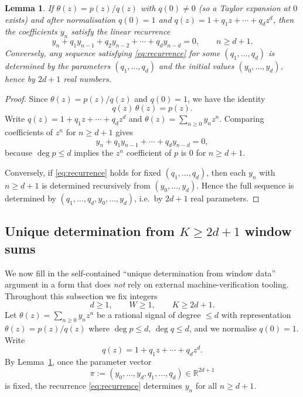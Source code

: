 \documentclass[11pt,reqno]{amsart}
\newtheorem{lemma}[theorem]{Lemma}
\theoremstyle{definition}
\theoremstyle{remark}
\newcommand{\R}{\mathbb{R}}
\newcommand{\1}{\mathbf{1}}
\begin{document}
\begin{lemma}\label{lem:recurrence}
If $\theta(z)=p(z)/q(z)$ with $q(0)\neq 0$ (so a Taylor expansion at $0$ exists) and after normalisation $q(0)=1$ and $q(z)=1+q_1 z+\cdots+q_d z^d$, then the coefficients
$y_n$ satisfy the linear recurrence
\begin{equation}\label{eq:recurrence}
y_n + q_1 y_{n-1}+q_2 y_{n-2}+\cdots+q_d y_{n-d}=0,\qquad n\ge d+1.
\end{equation}
Conversely, any sequence satisfying \eqref{eq:recurrence} for some $(q_1,\dots,q_d)$ is determined by the
parameters $(q_1,\dots,q_d)$ and the initial values $(y_0,\dots,y_d)$, hence by $2d+1$ real numbers.
\end{lemma}

\begin{proof}

Since $\theta(z)=p(z)/q(z)$ and $q(0)=1$, we have the identity
\[
q(z)\,\theta(z)=p(z).
\]
Write $q(z)=1+q_1 z+\cdots+q_d z^d$ and $\theta(z)=\sum_{n\ge 0} y_n z^n$.
Comparing coefficients of $z^n$ for $n\ge d+1$ gives
\[
y_n+q_1y_{n-1}+\cdots+q_dy_{n-d}=0,
\]
because $\deg p\le d$ implies the $z^n$ coefficient of $p$ is $0$ for $n\ge d+1$.

Conversely, if \eqref{eq:recurrence} holds for fixed $(q_1,\dots,q_d)$, then each $y_n$ with $n\ge d+1$ is determined recursively from $(y_0,\dots,y_d)$. Hence the full sequence is determined by $(q_1,\dots,q_d,y_0,\dots,y_d)$, i.e.\ by $2d+1$ real parameters.

\end{proof}

\subsection{\texorpdfstring{Unique determination from $K\ge 2d+1$ window sums}{Unique determination from K>=2d+1 window sums}}\label{subsec:window-uniq}
We now fill in the self-contained ``unique determination from window data'' argument in a form
that does \emph{not} rely on external machine-verification tooling. Throughout this subsection we fix integers
\[
d\ge 1,\qquad W\ge 1,\qquad K\ge 2d+1.
\]
Let $\theta(z)=\sum_{n\ge 0}y_n z^n$ be a rational signal of degree $\le d$ with representation
$\theta(z)=p(z)/q(z)$ where $\deg p\le d$, $\deg q\le d$, and we normalise $q(0)=1$. Write
\[
q(z)=1+q_1 z+\cdots+q_d z^d.
\]
By Lemma~\ref{lem:recurrence}, once the parameter vector
\[
\pi:=(y_0,\dots,y_d,q_1,\dots,q_d)\in\R^{2d+1}
\]
is fixed, the recurrence \eqref{eq:recurrence} determines $y_n$ for all $n\ge d+1$.
\end{document}
